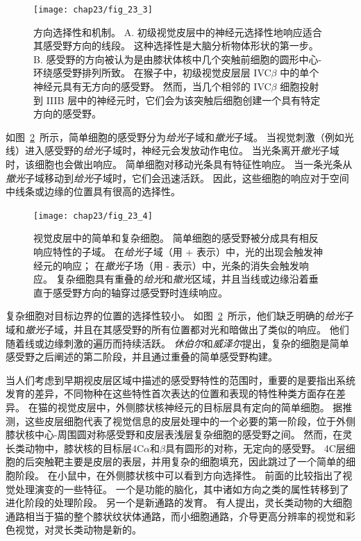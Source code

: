 \begin{figure}[htbp]
	\centering
	\texttt{[image: chap23/fig\_23\_3]}
	\caption{方向选择性和机制。
		A. 初级视觉皮层中的神经元选择性地响应适合其感受野方向的线段。
		这种选择性是大脑分析物体形状的第一步\cite{hubel1968receptive}。
		B. 感受野的方向被认为是由膝状体核中几个突触前细胞的圆形中心-环绕感受野排列所致。
		在猴子中，初级视觉皮层层 IVC$\beta$ 中的单个神经元具有无方向的感受野。
		然而，当几个相邻的 IVC$\beta$ 细胞投射到 IIIB 层中的神经元时，它们会为该突触后细胞创建一个具有特定方向的感受野。}
	\label{fig:23_3}
\end{figure}


如图~\ref{fig:23_4}~所示，简单细胞的感受野分为\textit{给光}子域和\textit{撤光}子域。
当视觉刺激（例如光线）进入感受野的\textit{给光}子域时，神经元会发放动作电位。
当光条离开\textit{撤光}子域时，该细胞也会做出响应。
简单细胞对移动光条具有特征性响应。
当一条光条从\textit{撤光}子域移动到\textit{给光}子域时，它们会迅速活跃。
因此，这些细胞的响应对于空间中线条或边缘的位置具有很高的选择性。


\begin{figure}[htbp]
	\centering
	\texttt{[image: chap23/fig\_23\_4]}
	\caption{视觉皮层中的简单和复杂细胞。
		简单细胞的感受野被分成具有相反响应特性的子域。
		在\textit{给光}子域（用 + 表示）中，光的出现会触发神经元的响应；
		在\textit{撤光}子场（用 - 表示）中，光条的消失会触发响应。
		复杂细胞具有重叠的\textit{给光}和\textit{撤光}区域，并且当线或边缘沿着垂直于感受野方向的轴穿过感受野时连续响应。}
	\label{fig:23_4}
\end{figure}


复杂细胞对目标边界的位置的选择性较小。
如图~\ref{fig:23_4}~所示，他们缺乏明确的\textit{给光}子域和\textit{撤光}子域，并且在其感受野的所有位置都对光和暗做出了类似的响应。
他们随着线或边缘刺激的遍历而持续活跃。
\textit{休伯尔}和\textit{威泽尔}提出，复杂的细胞是简单感受野之后阐述的第二阶段，并且通过重叠的简单感受野构建。


当人们考虑到早期视皮层区域中描述的感受野特性的范围时，重要的是要指出系统发育的差异，不同物种在这些特性首次表达的位置和表现的特性种类方面存在差异。
在猫的视觉皮层中，外侧膝状核神经元的目标层具有定向的简单细胞。
据推测，这些皮层细胞代表了视觉信息的皮层处理中的一个必要的第一阶段，位于外侧膝状核中心-周围圆对称感受野和皮层表浅层复杂细胞的感受野之间。
然而，在灵长类动物中，膝状核的目标层4C$\alpha$和$\beta$具有圆形的对称，无定向的感受野。
4C层细胞的后突触靶主要是皮层的表层，并用复杂的细胞填充，因此跳过了一个简单的细胞阶段。
在小鼠中，在外侧膝状核中可以看到方向选择性。
前面的比较指出了视觉处理演变的一些特征。
一个是功能的脑化，其中诸如方向之类的属性转移到了进化阶段的处理阶段。
另一个是新通路的发育。
有人提出，灵长类动物的大细胞通路相当于猫的整个膝状纹状体通路，而小细胞通路，介导更高分辨率的视觉和彩色视觉，对灵长类动物是新的。


